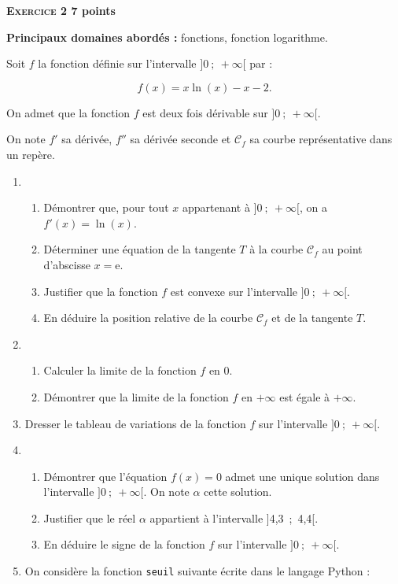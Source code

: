 \documentclass[11pt]{article}
\begin{document}
\bigskip

\textbf{\textsc{Exercice 2} \hfill 7 points}

\textbf{Principaux domaines abordés :} fonctions, fonction logarithme.

\medskip

Soit $f$ la fonction définie sur l'intervalle $]0~;~+\infty[$ par :

\[f(x) = x \ln (x) - x - 2.\]

On admet que la fonction $f$ est deux fois dérivable sur $]0~;~+\infty[$.

On note $f'$ sa dérivée, $f''$ sa dérivée seconde et $\mathcal{C}_f$ sa courbe représentative dans un repère.

\medskip

\begin{enumerate}
\item 
	\begin{enumerate}
		\item Démontrer que, pour tout $x$ appartenant à $]0~;~+\infty[$, on a $f'(x) = \ln (x)$.
		\item Déterminer une équation de la tangente $T$ à la courbe $\mathcal{C}_f$ au point
d'abscisse $x = $e.
		\item Justifier que la fonction $f$ est convexe sur l'intervalle $]0~;~+\infty[$.
		\item En déduire la position relative de la courbe $\mathcal{C}_f$ et de la tangente $T$.
	\end{enumerate}	
\item 
	\begin{enumerate}
		\item Calculer la limite de la fonction $f$ en $0$.
		\item Démontrer que la limite de la fonction $f$ en $+\infty$ est égale à $+\infty$.
	\end{enumerate}
\item Dresser le tableau de variations de la fonction $f$ sur l'intervalle $]0~;~+\infty[$.
\item 
	\begin{enumerate}
		\item Démontrer que l'équation $f(x) = 0$ admet une unique solution dans
l'intervalle $]0~;~+\infty[$. On note $\alpha$ cette solution.
		\item Justifier que le réel $\alpha$ appartient à l'intervalle ]4,3~;~4,4[.
		\item En déduire le signe de la fonction $f$ sur l'intervalle $]0~;~+\infty[$.
	\end{enumerate}	
\item On considère la fonction \texttt{seuil} suivante écrite dans le langage Python :


\end{enumerate}
\end{document}
